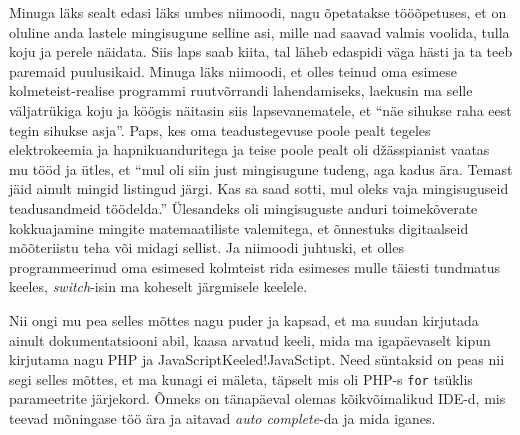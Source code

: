Minuga läks sealt edasi läks umbes niimoodi, nagu õpetatakse tööõpetuses, et on 
oluline  anda lastele mingisugune selline asi, mille nad saavad valmis voolida, 
tulla koju ja perele näidata. Siis laps saab kiita, tal  läheb edaspidi väga 
hästi ja ta teeb paremaid puulusikaid. Minuga läks niimoodi, et olles teinud 
oma esimese  kolmeteist-realise programmi ruutvõrrandi lahendamiseks, laekusin 
ma  selle väljatrükiga koju ja köögis näitasin siis  lapsevanematele, et 
\enquote{näe sihukse raha eest tegin sihukse asja}. Paps, kes oma 
teadustegevuse poole pealt tegeles elektrokeemia ja hapnikuanduritega ja teise 
poole pealt oli džässpianist vaatas mu tööd ja ütles, et \enquote{mul oli siin 
just mingisugune tudeng, aga kadus ära. Temast jäid ainult mingid listingud 
järgi. Kas sa saad sotti,  mul oleks vaja mingisuguseid  teadusandmeid 
töödelda.} Ülesandeks oli mingisuguste anduri toimekõverate kokkuajamine 
mingite matemaatiliste valemitega, et õnnestuks digitaalseid mõõteriistu teha 
või midagi sellist. Ja niimoodi juhtuski, et olles  programmeerinud oma 
esimesed kolmteist rida esimeses mulle täiesti tundmatus keeles, 
\emph{switch}-isin ma koheselt järgmisele keelele.

Nii ongi mu pea selles mõttes nagu puder ja kapsad, et ma suudan kirjutada 
ainult dokumentatsiooni abil, kaasa arvatud keeli, mida ma igapäevaselt kipun  
kirjutama nagu  PHP ja JavaScript{Keeled!JavaSctipt}. Need 
süntaksid on peas nii segi selles mõttes, et ma kunagi ei mäleta, täpselt mis 
oli PHP-s  \verb|for| tsüklis  parameetrite järjekord. Õnneks on tänapäeval 
olemas kõikvõimalikud IDE-d, mis teevad mõningase töö ära ja aitavad \emph{auto 
complete}-da ja mida iganes. 


